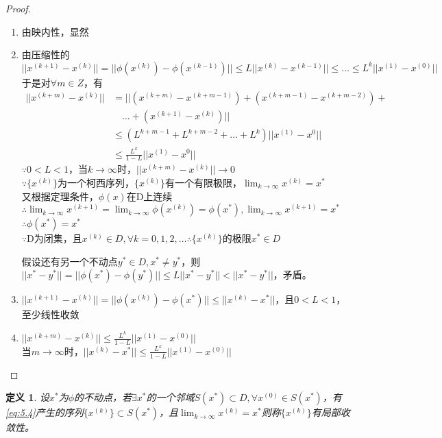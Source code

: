 \documentclass[a4paper]{article}
\newtheorem{definition}{定义}[section]
\begin{document}
\begin{proof}
    \begin{enumerate}
        \item 由映内性，显然
        \item 由压缩性的$||x^{(k+1)}-x^{(k)}||=||\phi(x^{(k)})-\phi(x^{(k-1)})||\le L||x^{(k)}-x^{(k-1)}||\le \dots \le L^k||x^{(1)}-x^{(0)} ||$\\
        于是对$\forall m \in Z$，有
        \begin{equation*}
            \begin{split}
                ||x^{(k+m)}-x^{(k)}|| &= ||(x^{(k+m)}-x^{(k+m-1)})+(x^{(k+m-1)}-x^{(k+m-2)})+\\
                &\quad \dots + (x^{(k+1)}-x^{(k)}) ||\\
                &\le (L^{k+m-1}+L^{k+m-2}+\dots+L^k)||x^{(1)}-x^{0}|| \\
                &\le \frac{L^k}{1-L}||x^{(1)}-x^{0}||
            \end{split}
        \end{equation*}
        $\because 0<L<1$，当$k\rightarrow\infty$时，$||x^{(k+m)}-x^{(k)}||\rightarrow 0$\\
        $\because \{x^{(k)} \}$为一个柯西序列，$\{x^{(k)} \}$有一个有限极限，$\lim_{k\rightarrow\infty}x^{(k)}=x^* $\\
        又根据定理条件，$\phi(x)$在D上连续$\therefore \lim_{k\rightarrow \infty}x^{(k+1)}=\lim_{k\rightarrow \infty}\phi(x^{(k)})=\phi(x^*), \lim_{k\rightarrow \infty}x^{(k+1)}=x^* $\\
        $\therefore \phi(x^*)=x^* $\\
        $\because$D为闭集，且$x^{(k)}\in D, \forall k=0,1,2,\dots \therefore \{x^{(k)} \}$的极限$x^*\in D$

        假设还有另一个不动点$y^*\in D, x^*\neq y^*$，则$||x^*-y^*||=||\phi(x^*)-\phi(y^*) ||\le L||x^*-y^*||<||x^*-y^*||$，矛盾。
        \item $||x^{(k+1)}-x^{(k)}||=||\phi(x^{(k)})-\phi(x^*) ||\le ||x^{(k)}-x^*||$，且$0<L<1$，至少线性收敛
        \item $||x^{(k+m)}-x^{(k)}||\le \frac{L^k}{1-L}||x^{(1)}-x^{(0)}||$\\
            当$m\rightarrow\infty$时，$||x^{(k)}-x^*||\le \frac{L^k}{1-L}||x^{(1)}-x^{(0)}||$
    \end{enumerate}
\end{proof}

\begin{definition}
    设$x^*$为$\phi$的不动点，若$\exists x^*$的一个邻域$S(x^*)\subset D, \forall x^{(0)}\in S(x^*) $，有\ref{eq:5.4}产生的序列$\{x^{(k)} \}\subset S(x^*) $，且$\lim_{k\rightarrow\infty}x^{(k)}=x^* $则称$\{x^{(k)} \}$有局部收敛性。
\end{definition}
\end{document}
